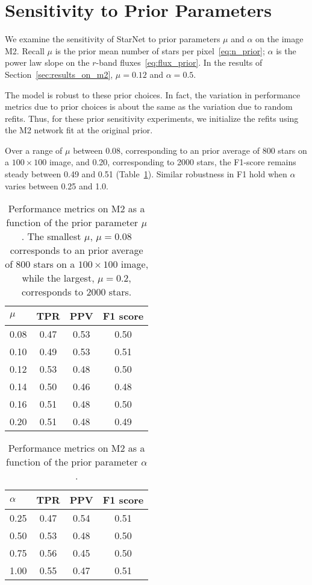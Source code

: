 \section{Sensitivity to Prior Parameters}
\label{sec:prior_sensitivity}

We examine the sensitivity of StarNet to prior parameters $\mu$ and $\alpha$ on the image M2. 
Recall $\mu$ is the prior mean number of stars per pixel~\eqref{eq:n_prior};
$\alpha$ is the power law slope on the $r$-band fluxes~\eqref{eq:flux_prior}. 
In the results of Section~\ref{sec:results_on_m2}, $\mu=0.12$ and  $\alpha = 0.5$. 

The model is robust to these prior choices. 
In fact, the variation in performance metrics
due to prior choices is about the same as the 
variation due to random refits.
Thus, for these prior sensitivity experiments, 
we initialize the refits using the M2 network
fit at the original prior. 

Over a  range of $\mu$ between 0.08, corresponding to 
an prior average of 800 stars on a $100\times100$ image, 
and 0.20, corresponding to 2000 stars, 
the F1-score remains steady between 0.49 and 0.51 (Table~\ref{tab:mu_sensitivity}). 
Similar robustness in F1 hold when $\alpha$ varies between 
0.25 and 1.0. 

\begin{table}[!tb]
\centering
\begin{tabular}{l|ccc}
\toprule
$\mu$ &   TPR &   PPV &  F1 score \\
\midrule
0.08 &  0.47 &  0.53 & 0.50 \\
0.10 &  0.49 &  0.53 & 0.51 \\
0.12 &  0.53 &  0.48 & 0.50 \\
0.14 &  0.50 &  0.46 & 0.48 \\
0.16 &  0.51 &  0.48 & 0.50 \\
0.20 &  0.51 &  0.48 & 0.49 \\
\bottomrule
\end{tabular}
\caption{Performance metrics on M2 as a function of 
the prior parameter $\mu$. 
The smallest $\mu$, $\mu = 0.08$ corresponds to 
an prior average of 800 stars on a $100\times100$ image, 
while the largest, $\mu = 0.2$, corresponds to 2000 stars. }
\label{tab:mu_sensitivity}
\end{table}


\begin{table}[!tb]
\centering
\begin{tabular}{l|ccc}
\toprule
$\alpha$ &   TPR &   PPV &  F1 score \\
\midrule
0.25 &  0.47 &  0.54 & 0.51 \\
0.50 &  0.53 &  0.48 & 0.50 \\
0.75 &  0.56 &  0.45 & 0.50 \\
1.00 &  0.55 &  0.47 & 0.51 \\
\bottomrule
\end{tabular}
\caption{Performance metrics on M2 as a function of 
the prior parameter $\alpha$. }
\label{tab:alpha_sensitivity}
\end{table}

